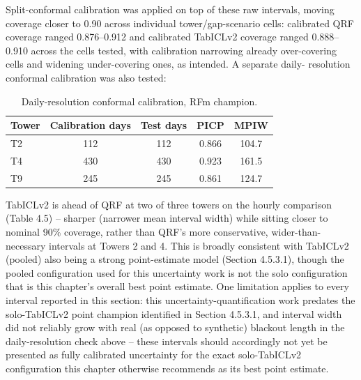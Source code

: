 \FloatBarrier

Split-conformal calibration was applied on top of these raw intervals, moving coverage closer to
0.90 across individual tower/gap-scenario cells: calibrated QRF coverage ranged 0.876--0.912 and
calibrated TabICLv2 coverage ranged 0.888--0.910 across the cells tested, with calibration narrowing
already over-covering cells and widening under-covering ones, as intended. A separate daily-
resolution conformal calibration was also tested:

\begin{table}[h]
\centering
\begin{tabular}{lcccc}
\toprule
Tower & Calibration days & Test days & PICP & MPIW \\
\midrule
T2 & 112 & 112 & 0.866 & 104.7 \\
T4 & 430 & 430 & 0.923 & 161.5 \\
T9 & 245 & 245 & 0.861 & 124.7 \\
\bottomrule
\end{tabular}
\caption{Daily-resolution conformal calibration, RFm champion.}
\end{table}

TabICLv2 is ahead of QRF at two of three towers on the hourly comparison (Table 4.5) -- sharper
(narrower mean interval width) while sitting closer to nominal 90\% coverage, rather than QRF's more
conservative, wider-than-necessary intervals at Towers 2 and 4. This is broadly consistent with
TabICLv2 (pooled) also being a strong point-estimate model (Section 4.5.3.1), though the pooled
configuration used for this uncertainty work is not the solo configuration that is this chapter's
overall best point estimate. One limitation applies to every interval reported in this section: this
uncertainty-quantification work predates the solo-TabICLv2 point champion identified in
Section 4.5.3.1, and interval width did not reliably grow with real (as opposed to synthetic)
blackout length in the daily-resolution check above -- these intervals should accordingly not yet be
presented as fully calibrated uncertainty for the exact solo-TabICLv2 configuration this chapter
otherwise recommends as its best point estimate.
